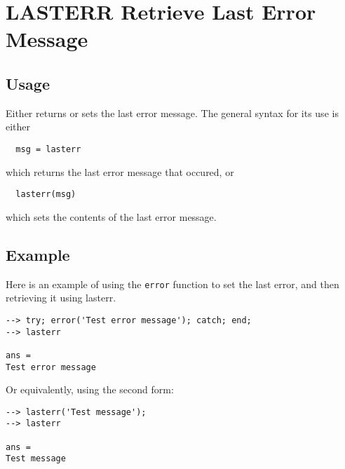 \section{LASTERR Retrieve Last Error Message}

\subsection{Usage}

Either returns or sets the last error message.  The
general syntax for its use is either
\begin{verbatim}
  msg = lasterr
\end{verbatim}
which returns the last error message that occured, or
\begin{verbatim}
  lasterr(msg)
\end{verbatim}
which sets the contents of the last error message.
\subsection{Example}

Here is an example of using the \verb|error| function to
set the last error, and then retrieving it using
lasterr.
\begin{verbatim}
--> try; error('Test error message'); catch; end;
--> lasterr

ans = 
Test error message
\end{verbatim}
Or equivalently, using the second form:
\begin{verbatim}
--> lasterr('Test message');
--> lasterr

ans = 
Test message
\end{verbatim}
